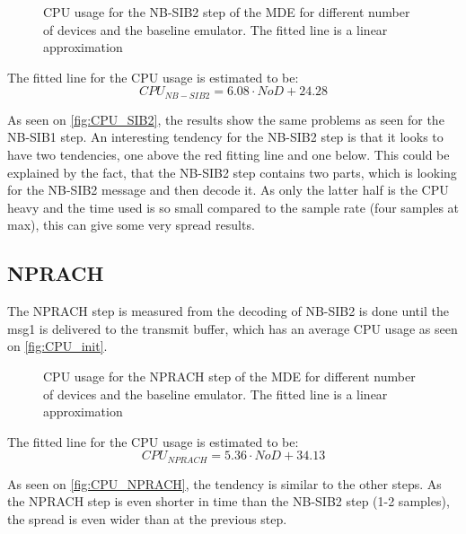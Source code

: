 \begin{figure}[H]
\centering
\resizebox{0.5\textwidth}{!}{
}
\caption{CPU usage for the NB-SIB2 step of the MDE for different number of devices and the baseline emulator. The fitted line is a linear approximation}
\label{fig:CPU_SIB2}
\end{figure}

The fitted line for the CPU usage is estimated to be:
\begin{equation}
CPU_{NB-SIB2} = 6.08 \cdot NoD + 24.28
\end{equation}

As seen on \autoref{fig:CPU_SIB2}, the results show the same problems as seen for the NB-SIB1 step. An interesting tendency for the NB-SIB2 step is that it looks to have two tendencies, one above the red fitting line and one below. This could be explained by the fact, that the NB-SIB2 step contains two parts, which is looking for the NB-SIB2 message and then decode it. As only the latter half is the CPU heavy and the time used is so small compared to the sample rate (four samples at max), this can give some very spread results. 



\subsection{NPRACH}
The NPRACH step is measured from the decoding of NB-SIB2 is done until the msg1 is delivered to the transmit buffer, which has an average CPU usage as seen on \autoref{fig:CPU_init}.

\begin{figure}[H]
\centering
\resizebox{0.5\textwidth}{!}{
}
\caption{CPU usage for the NPRACH step of the MDE for different number of devices and the baseline emulator. The fitted line is a linear approximation}
\label{fig:CPU_NPRACH}
\end{figure}

The fitted line for the CPU usage is estimated to be:
\begin{equation}
CPU_{NPRACH} = 5.36 \cdot NoD + 34.13
\end{equation}

As seen on \autoref{fig:CPU_NPRACH}, the tendency is similar to the other steps. As the NPRACH step is even shorter in time than the NB-SIB2 step (1-2 samples), the spread is even wider than at the previous step.

